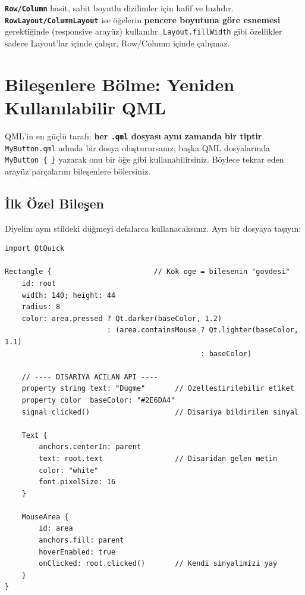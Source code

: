 \documentclass[11pt,a4paper]{article}
\newcommand{\kls}[1]{\texttt{\color{anaMavi}\textbf{#1}}}
\newcommand{\kod}[1]{\texttt{\color{koyuGri}#1}}
\begin{document}
\begin{ipucukutu}
\kls{Row/Column} basit, sabit boyutlu dizilimler için hafif ve hızlıdır.
\kls{RowLayout/ColumnLayout} ise öğelerin \textbf{pencere boyutuna göre esnemesi}
gerektiğinde (responsive arayüz) kullanılır. \kod{Layout.fillWidth} gibi
özellikler sadece Layout'lar içinde çalışır, Row/Column içinde çalışmaz.
\end{ipucukutu}

\section{Bileşenlere Bölme: Yeniden Kullanılabilir QML}

QML'in en güçlü tarafı: \textbf{her \kod{.qml} dosyası aynı zamanda bir tiptir}.
\kod{MyButton.qml} adında bir dosya oluşturursanız, başka QML dosyalarında
\kod{MyButton \{ \}} yazarak onu bir öğe gibi kullanabilirsiniz. Böylece tekrar
eden arayüz parçalarını bileşenlere bölersiniz.

\subsection{İlk Özel Bileşen}

Diyelim aynı stildeki düğmeyi defalarca kullanacaksınız. Ayrı bir dosyaya
taşıyın:

\begin{ornekkutu}
\end{ornekkutu}
\begin{lstlisting}
import QtQuick

Rectangle {                        // Kok oge = bilesenin "govdesi"
    id: root
    width: 140; height: 44
    radius: 8
    color: area.pressed ? Qt.darker(baseColor, 1.2)
                        : (area.containsMouse ? Qt.lighter(baseColor, 1.1)
                                              : baseColor)

    // ---- DISARIYA ACILAN API ----
    property string text: "Dugme"       // Ozellestirilebilir etiket
    property color  baseColor: "#2E6DA4"
    signal clicked()                    // Disariya bildirilen sinyal

    Text {
        anchors.centerIn: parent
        text: root.text                 // Disaridan gelen metin
        color: "white"
        font.pixelSize: 16
    }

    MouseArea {
        id: area
        anchors.fill: parent
        hoverEnabled: true
        onClicked: root.clicked()       // Kendi sinyalimizi yay
    }
}
\end{lstlisting}
\end{document}

